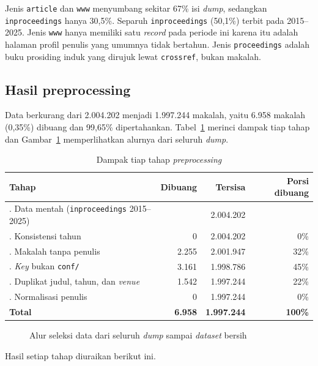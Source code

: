 Jenis \texttt{article} dan \texttt{www} menyumbang sekitar 67\% isi \textit{dump}, sedangkan \texttt{inproceedings} hanya 30,5\%. Separuh \texttt{inproceedings} (50,1\%) terbit pada 2015--2025. Jenis \texttt{www} hanya memiliki satu \textit{record} pada periode ini karena itu adalah halaman profil penulis yang umumnya tidak bertahun. Jenis \texttt{proceedings} adalah buku prosiding induk yang dirujuk lewat \texttt{crossref}, bukan makalah.

\subsection{Hasil preprocessing}
\label{sec:hasil-prepro}
Data berkurang dari 2.004.202 menjadi 1.997.244 makalah, yaitu 6.958 makalah (0,35\%) dibuang dan 99,65\% dipertahankan. Tabel~\ref{tab:dampak} merinci dampak tiap tahap dan Gambar~\ref{fig:alur-seleksi} memperlihatkan alurnya dari seluruh \textit{dump}.

\begin{table}[ht]
\caption{Dampak tiap tahap \textit{preprocessing}}
\label{tab:dampak}
\small
\begin{tabularx}{\textwidth}{@{}>{\raggedright\arraybackslash}X rrr@{}}
\toprule
\textbf{Tahap} & \textbf{Dibuang} & \textbf{Tersisa} & \textbf{Porsi dibuang} \\
\midrule
0. Data mentah (\texttt{inproceedings} 2015--2025) & & 2.004.202 & \\
1. Konsistensi tahun & 0 & 2.004.202 & 0\% \\
2. Makalah tanpa penulis & 2.255 & 2.001.947 & 32\% \\
3. \textit{Key} bukan \texttt{conf/} & 3.161 & 1.998.786 & 45\% \\
4. Duplikat judul, tahun, dan \textit{venue} & 1.542 & 1.997.244 & 22\% \\
5. Normalisasi penulis & 0 & 1.997.244 & 0\% \\
\midrule
\textbf{Total} & \textbf{6.958} & \textbf{1.997.244} & \textbf{100\%} \\
\bottomrule
\end{tabularx}
\end{table}

\begin{figure}[ht]
\centering
{}
\caption{Alur seleksi data dari seluruh \textit{dump} sampai \textit{dataset} bersih}
\label{fig:alur-seleksi}
\end{figure}

Hasil setiap tahap diuraikan berikut ini.


